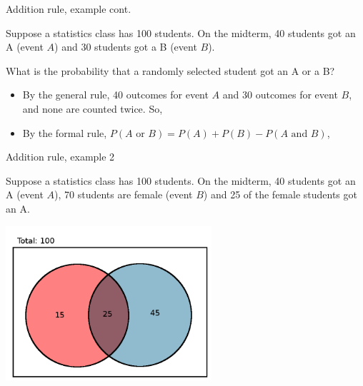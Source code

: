 \documentclass[xcolor=table, aspectratio=169, bigger, handout]{beamer}
\begin{document}
\begin{frame}{Addition rule, example cont.}
\begin{block}{}
Suppose a statistics class has 100 students. On the midterm, 40 students got an A (event $A$) and 30 students got a B (event $B$).
\end{block}

\begin{exampleblock}{}
What is the probability that a randomly selected student got an A or a B?
\begin{itemize}
\pause
\item By the general rule, 40 outcomes for event $A$ and 30 outcomes for event $B$, and none are counted twice. So,\\
\smallskip{}
\pause
\item By the formal rule, $P(A \text{ or } B) = P(A) + P(B) - P(A \text{ and } B)$,\\
\smallskip{}
\smallskip{}
\end{itemize}
\end{exampleblock}
\end{frame}

\begin{frame}{Addition rule, example 2}
\begin{block}{}
Suppose a statistics class has 100 students. On the midterm, 40 students got an A (event $A$),  70 students are female (event $B$) and 25 of the female students got an A.
\end{block}

{\centering
\includegraphics[width=3in]{../images/ch4_venn_ovr_ex}\par
}
\end{frame}
\end{document}
